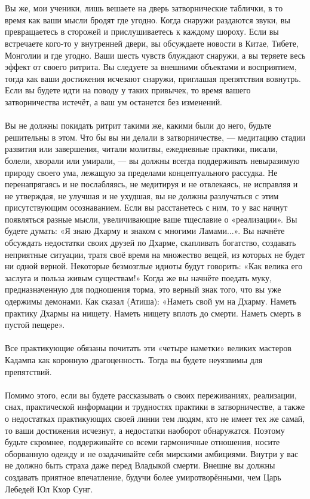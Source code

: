 \\ \\ Вы же, мои ученики, лишь вешаете на дверь затворнические таблички, в то время как ваши мысли бродят где угодно. Когда снаружи раздаются звуки, вы превращаетесь в сторожей и прислушиваетесь к каждому шороху. Если вы встречаете кого-то у внутренней двери, вы обсуждаете новости в Китае, Тибете, Монголии и где угодно. Ваши шесть чувств блуждают снаружи, а вы теряете весь эффект от своего ритрита. Вы следуете за внешними объектами и восприятием, тогда как ваши достижения исчезают снаружи, приглашая препятствия вовнутрь. Если вы будете идти на поводу у таких привычек, то время вашего затворничества истечёт, а ваш ум останется без изменений.
\\ \\ Вы не должны покидать ритрит такими же, какими были до него, будьте решительны в этом. Что бы вы ни делали в затворничестве, — медитацию стадии развития или завершения, читали молитвы, ежедневные практики, писали, болели, хворали или умирали, — вы должны всегда поддерживать невыразимую природу своего ума, лежащую за пределами концептуального рассудка. Не перенапрягаясь и не послабляясь, не медитируя и не отвлекаясь, не исправляя и не утверждая, не улучшая и не ухудшая, вы не должны разлучаться с этим присутствующим осознаванием. Если вы расстанетесь с ним, то у вас начнут появляться разные мысли, увеличивающие ваше тщеславие о «реализации». Вы будете думать: «Я знаю Дхарму и знаком с многими Ламами...». Вы начнёте обсуждать недостатки своих друзей по Дхарме, скапливать богатство, создавать неприятные ситуации, тратя своё время на множество вещей, из которых не будет ни одной верной. Некоторые безмозглые идиоты будут говорить: «Как велика его заслуга и польза живым существам!» Когда же вы начнёте поедать муку, предназначенную для подношения торма, это верный знак того, что вы уже одержимы демонами. Как сказал (Атиша): «Наметь свой ум на Дхарму. Наметь практику Дхармы на нищету. Наметь нищету вплоть до смерти. Наметь смерть в пустой пещере».
\newpage
\\ \\ Все практикующие обязаны почитать эти «четыре наметки» великих мастеров Кадампа как коронную драгоценность. Тогда вы будете неуязвимы для препятствий.
\\ \\ Помимо этого, если вы будете рассказывать о своих переживаниях, реализации, снах, практической информации и трудностях практики в затворничестве, а также о недостатках практикующих своей линии тем людям, кто не имеет тех же самай, то ваши достижения исчезнут, а недостатки наоборот обнаружатся. Поэтому будьте скромнее, поддерживайте со всеми гармоничные отношения, носите оборванную одежду и не озадачивайте себя мирскими амбициями. Внутри у вас не должно быть страха даже перед Владыкой смерти. Внешне вы должны создавать приятное впечатление, будучи более умиротворёнными, чем Царь Лебедей Юл Кхор Сунг.
